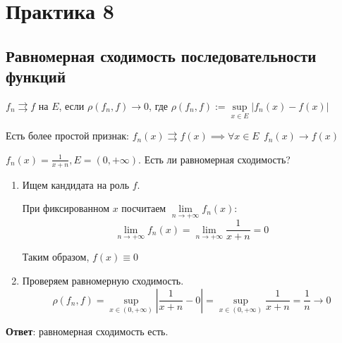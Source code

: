 

\cfoot{}
\rfoot{}



\section*{Практика 8}

\subsection*{Равномерная сходимость последовательности функций}

\begin{definition}
    \(f_n \rightrightarrows f\) на \(E\), если \(\rho(f_n, f) \to 0\), где \(\rho(f_n, f) := \sup\limits_{x\in E} |f_n(x) - f(x)|\)
\end{definition}

\begin{remark}
    Есть более простой признак: \(f_n(x) \rightrightarrows f(x) \implies \forall x\in E \ \ f_n(x) \to f(x)\)
\end{remark}

\begin{exercise}[Демидович, 2749]
    \(f_n(x) = \frac{1}{x + n}, E = (0, +\infty)\). Есть ли равномерная сходимость?

    \begin{enumerate}
        \item Ищем кандидата на роль \(f\).

              При фиксированном \(x\) посчитаем \(\lim\limits_{n\to + \infty} f_n(x)\):
              \[\lim\limits_{n\to + \infty} f_n(x) = \lim\limits_{n\to +\infty} \frac{1}{x + n} = 0\]

              Таким образом, \(f(x)\equiv 0\)
        \item Проверяем равномерную сходимость.
              \[\rho(f_n, f) = \sup_{x\in(0, +\infty)} \left|\frac{1}{x + n} - 0\right| = \sup_{x\in(0, +\infty)} \frac{1}{x + n} = \frac{1}{n} \to 0\]
    \end{enumerate}

    \textbf{Ответ}: равномерная сходимость есть.
\end{exercise}

